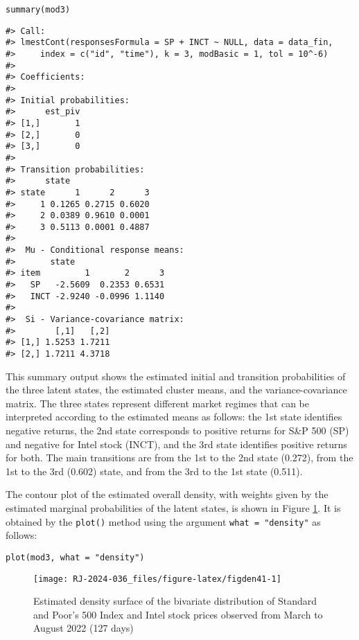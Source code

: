 \begin{verbatim}
summary(mod3)
\end{verbatim}

\begin{verbatim}
#> Call:
#> lmestCont(responsesFormula = SP + INCT ~ NULL, data = data_fin, 
#>     index = c("id", "time"), k = 3, modBasic = 1, tol = 10^-6)
#> 
#> Coefficients:
#> 
#> Initial probabilities:
#>      est_piv
#> [1,]       1
#> [2,]       0
#> [3,]       0
#> 
#> Transition probabilities:
#>      state
#> state      1      2      3
#>     1 0.1265 0.2715 0.6020
#>     2 0.0389 0.9610 0.0001
#>     3 0.5113 0.0001 0.4887
#> 
#>  Mu - Conditional response means:
#>       state
#> item         1       2      3
#>   SP   -2.5609  0.2353 0.6531
#>   INCT -2.9240 -0.0996 1.1140
#> 
#>  Si - Variance-covariance matrix:
#>        [,1]   [,2]
#> [1,] 1.5253 1.7211
#> [2,] 1.7211 4.3718
\end{verbatim}

This summary output shows the estimated initial and transition
probabilities of the three latent states, the estimated cluster means,
and the variance-covariance matrix. The three states represent different
market regimes that can be interpreted according to the estimated means
as follows: the 1st state identifies negative returns, the 2nd state
corresponds to positive returns for S\&P 500 (SP) and negative for
Intel stock (INCT), and the 3rd state identifies positive returns
for both. The main transitions are from the 1st to the 2nd state
(0.272), from the 1st to the 3rd (0.602) state, and from the 3rd to the
1st state (0.511).

The contour plot of the estimated overall density, with weights given by
the estimated marginal probabilities of the latent states, is shown in
Figure \ref{fig:figden41}. It is obtained by the \texttt{plot()} method using
the argument \texttt{what\ =\ "density"} as follows:

\begin{verbatim}
plot(mod3, what = "density")
\end{verbatim}

\begin{figure}

{\centering \texttt{[image: RJ-2024-036\_files/figure-latex/figden41-1]} 

}

\caption{Estimated density surface of the bivariate distribution of Standard and Poor's  500 Index and Intel stock prices observed from March to August 2022  (127 days)}\label{fig:figden41}
\end{figure}

